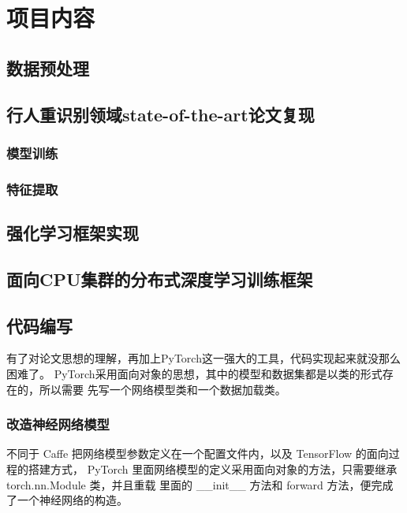 \section{项目内容}

\subsection{数据预处理}

\subsection{行人重识别领域state-of-the-art论文复现}

\subsubsection{模型训练}

\subsubsection{特征提取}

\subsection{强化学习框架实现}

\subsection{面向CPU集群的分布式深度学习训练框架}


\subsection{代码编写}
有了对论文思想的理解，再加上PyTorch这一强大的工具，代码实现起来就没那么困难了。
PyTorch采用面向对象的思想，其中的模型和数据集都是以类的形式存在的，所以需要
先写一个网络模型类和一个数据加载类。

\subsubsection{改造神经网络模型}
不同于 Caffe 把网络模型参数定义在一个配置文件内，以及 TensorFlow 的面向过程的搭建方式，
PyTorch 里面网络模型的定义采用面向对象的方法，只需要继承 torch.nn.Module 类，并且重载
里面的 \_\_init\_\_\(\) 方法和 forward\(\) 方法，便完成了一个神经网络的构造。\\

